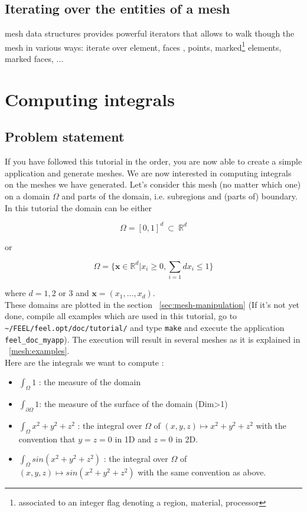 \subsection{Iterating over the entities of a mesh}

\feel mesh data structures provides powerful iterators that allows to
walk though the mesh in various ways: iterate over element, faces ,
points, marked\footnote{associated to an integer flag denoting a
  region, material, processor} elements, marked faces, ...

\section{Computing integrals}
\label{sec:computing-integrals}

\subsection{Problem statement}

If you have followed this tutorial in the order, you are now able to create a simple application and generate meshes. We are now interested in computing integrals on the meshes we have generated. Let's consider this mesh (no matter which one) on a domain $\Omega$ and parts of the domain, i.e. subregions and (parts of) boundary. In this tutorial the domain can be either

\[ \Omega=[0,1]^d\ \subset\ \mathbb{R}^d \]

or

\[ \Omega=\{ \mathbf{x} \in \mathbb{R}^d | x_i \geq 0, \sum_{i=1}{d} x_i \leq 1 \} \]

where $ d=1,2$ or $3$ and $\mathbf{x}=(x_1,...,x_d)$.\\
These domains are plotted in the section ~\ref{sec:mesh-manipulation} (If it's not yet done, compile all examples which are used in this tutorial, go to \lstinline!~/FEEL/feel.opt/doc/tutorial/! and type \verb|make| and execute the application \verb|feel_doc_myapp|). The execution will result in several meshes as it is explained in ~\ref{mesh:examples}.\\
Here are the integrals we want to compute :
\begin{itemize}
\item $\displaystyle{ \int_\Omega 1 }$ : the measure of the domain
\item $\displaystyle{ \int_{\partial\Omega} 1 }$: the measure of the surface of the domain (Dim>1)
\item $ \displaystyle{\int_{\Omega} x^2+y^2+z^2 }$ : the integral over $\displaystyle{\Omega}$ of $ \displaystyle{(x,y,z) \mapsto x^2+y^2+z^2}$ with the convention that $y=z=0$ in 1D and $ z=0 $ in 2D.
\item $\displaystyle{ \int_{\Omega} sin(x^2+y^2+z^2)} $ : the integral over $\Omega$ of $\displaystyle{ (x,y,z) \mapsto sin(x^2+y^2+z^2)}$ with the same convention as above.
\end{itemize}


